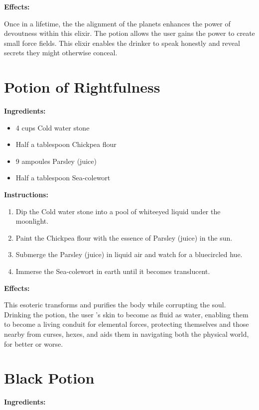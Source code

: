 \documentclass{article}
\begin{document}
\textbf{Effects:}

Once in a lifetime, the the alignment of the planets enhances the power of devoutness within this elixir. The potion allows the user gains the power to create small force fields. This elixir enables the drinker to speak honestly and reveal secrets they might otherwise conceal.

\newpage
\section*{Potion of Rightfulness}

\textbf{Ingredients:}

\begin{itemize}
  \item 4 cups Cold water stone
  \item Half a tablespoon Chickpea flour
  \item 9 ampoules Parsley (juice)
  \item Half a tablespoon Sea-colewort
\end{itemize}

\textbf{Instructions:}

\begin{enumerate}
  \item Dip the Cold water stone into a pool of whiteeyed liquid under the moonlight.
  \item Paint the Chickpea flour with the essence of Parsley (juice) in the sun.
  \item Submerge the Parsley (juice) in liquid air and watch for a bluecircled hue.
  \item Immerse the Sea-colewort in earth until it becomes translucent.
\end{enumerate}

\textbf{Effects:}

This esoteric transforms and purifies the body while corrupting the soul. Drinking the potion, the user 's skin to become as fluid as water, enabling them to become a living conduit for elemental forces, protecting themselves and those nearby from curses, hexes, and aids them in navigating both the physical world, for better or worse.

\newpage
\section*{Black Potion}

\textbf{Ingredients:}
\end{document}
